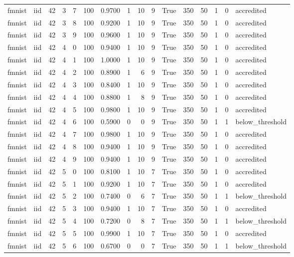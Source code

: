 \begin{tabular}{llrrrrrrrrrrrrrl}
fmnist & iid & 42 & 3 & 7 & 100 & 0.9700 & 1 & 10 & 9 & True & 350 & 50 & 1 & 0 & accredited \\
fmnist & iid & 42 & 3 & 8 & 100 & 0.9200 & 1 & 10 & 9 & True & 350 & 50 & 1 & 0 & accredited \\
fmnist & iid & 42 & 3 & 9 & 100 & 0.9600 & 1 & 10 & 9 & True & 350 & 50 & 1 & 0 & accredited \\
fmnist & iid & 42 & 4 & 0 & 100 & 0.9400 & 1 & 10 & 9 & True & 350 & 50 & 1 & 0 & accredited \\
fmnist & iid & 42 & 4 & 1 & 100 & 1.0000 & 1 & 10 & 9 & True & 350 & 50 & 1 & 0 & accredited \\
fmnist & iid & 42 & 4 & 2 & 100 & 0.8900 & 1 & 6 & 9 & True & 350 & 50 & 1 & 0 & accredited \\
fmnist & iid & 42 & 4 & 3 & 100 & 0.8400 & 1 & 10 & 9 & True & 350 & 50 & 1 & 0 & accredited \\
fmnist & iid & 42 & 4 & 4 & 100 & 0.8800 & 1 & 8 & 9 & True & 350 & 50 & 1 & 0 & accredited \\
fmnist & iid & 42 & 4 & 5 & 100 & 0.9800 & 1 & 10 & 9 & True & 350 & 50 & 1 & 0 & accredited \\
fmnist & iid & 42 & 4 & 6 & 100 & 0.5900 & 0 & 0 & 9 & True & 350 & 50 & 1 & 1 & below\_threshold \\
fmnist & iid & 42 & 4 & 7 & 100 & 0.9800 & 1 & 10 & 9 & True & 350 & 50 & 1 & 0 & accredited \\
fmnist & iid & 42 & 4 & 8 & 100 & 0.9400 & 1 & 10 & 9 & True & 350 & 50 & 1 & 0 & accredited \\
fmnist & iid & 42 & 4 & 9 & 100 & 0.9400 & 1 & 10 & 9 & True & 350 & 50 & 1 & 0 & accredited \\
fmnist & iid & 42 & 5 & 0 & 100 & 0.8100 & 1 & 10 & 7 & True & 350 & 50 & 1 & 0 & accredited \\
fmnist & iid & 42 & 5 & 1 & 100 & 0.9200 & 1 & 10 & 7 & True & 350 & 50 & 1 & 0 & accredited \\
fmnist & iid & 42 & 5 & 2 & 100 & 0.7400 & 0 & 6 & 7 & True & 350 & 50 & 1 & 1 & below\_threshold \\
fmnist & iid & 42 & 5 & 3 & 100 & 0.9400 & 1 & 10 & 7 & True & 350 & 50 & 1 & 0 & accredited \\
fmnist & iid & 42 & 5 & 4 & 100 & 0.7200 & 0 & 8 & 7 & True & 350 & 50 & 1 & 1 & below\_threshold \\
fmnist & iid & 42 & 5 & 5 & 100 & 0.9900 & 1 & 10 & 7 & True & 350 & 50 & 1 & 0 & accredited \\
fmnist & iid & 42 & 5 & 6 & 100 & 0.6700 & 0 & 0 & 7 & True & 350 & 50 & 1 & 1 & below\_threshold \\

\end{tabular}
